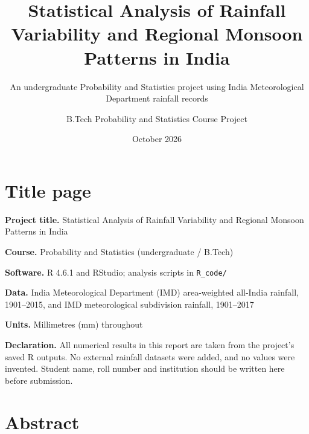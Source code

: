 \documentclass[
]{article}
\title{Statistical Analysis of Rainfall Variability and Regional Monsoon
Patterns in India}
\subtitle{An undergraduate Probability and Statistics project using
India Meteorological Department rainfall records}
\author{B.Tech Probability and Statistics Course Project}
\date{October 2026}
\begin{document}
\maketitle

{
\setcounter{tocdepth}{3}
\tableofcontents
}
\newpage

\section{Title page}\label{title-page}

\textbf{Project title.} Statistical Analysis of Rainfall Variability and
Regional Monsoon Patterns in India

\textbf{Course.} Probability and Statistics (undergraduate / B.Tech)

\textbf{Software.} R 4.6.1 and RStudio; analysis scripts in
\texttt{R\_code/}

\textbf{Data.} India Meteorological Department (IMD) area-weighted
all-India rainfall, 1901--2015, and IMD meteorological subdivision
rainfall, 1901--2017

\textbf{Units.} Millimetres (mm) throughout

\textbf{Declaration.} All numerical results in this report are taken
from the project's saved R outputs. No external rainfall datasets were
added, and no values were invented. Student name, roll number and
institution should be written here before submission.

\newpage

\section{Abstract}\label{abstract}
\end{document}
